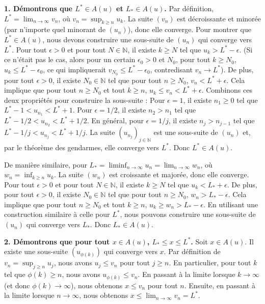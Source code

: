 \documentclass{report}
\begin{document}
\textbf{1. Démontrons que $L^* \in A(u)$ et $L_* \in A(u)$.}
Par définition, $L^* = \lim_{n \to \infty} v_n$, où $v_n = \sup_{k \ge n} u_k$. La suite $(v_n)$ est décroissante et minorée (par n'importe quel minorant de $(u_n)$), donc elle converge.
Pour montrer que $L^* \in A(u)$, nous devons construire une sous-suite de $(u_n)$ qui converge vers $L^*$.
Pour tout $\epsilon > 0$ et pour tout $N \in \mathbb{N}$, il existe $k \ge N$ tel que $u_k > L^* - \epsilon$. (Si ce n'était pas le cas, alors pour un certain $\epsilon_0 > 0$ et $N_0$, pour tout $k \ge N_0$, $u_k \le L^* - \epsilon_0$, ce qui impliquerait $v_{N_0} \le L^* - \epsilon_0$, contredisant $v_n \to L^*$).
De plus, pour tout $\epsilon > 0$, il existe $N_0 \in \mathbb{N}$ tel que pour tout $n \ge N_0$, $v_n < L^* + \epsilon$. Cela implique que pour tout $n \ge N_0$ et tout $k \ge n$, $u_k \le v_n < L^* + \epsilon$.
Combinons ces deux propriétés pour construire la sous-suite :
Pour $\epsilon = 1$, il existe $n_1 \ge 0$ tel que $L^* - 1 < u_{n_1} < L^* + 1$.
Pour $\epsilon = 1/2$, il existe $n_2 > n_1$ tel que $L^* - 1/2 < u_{n_2} < L^* + 1/2$.
En général, pour $\epsilon = 1/j$, il existe $n_j > n_{j-1}$ tel que $L^* - 1/j < u_{n_j} < L^* + 1/j$.
La suite $(u_{n_j})_{j \in \mathbb{N}}$ est une sous-suite de $(u_n)$ et, par le théorème des gendarmes, elle converge vers $L^*$.
Donc $L^* \in A(u)$.

De manière similaire, pour $L_* = \liminf_{n \to \infty} u_n = \lim_{n \to \infty} w_n$, où $w_n = \inf_{k \ge n} u_k$. La suite $(w_n)$ est croissante et majorée, donc elle converge.
Pour tout $\epsilon > 0$ et pour tout $N \in \mathbb{N}$, il existe $k \ge N$ tel que $u_k < L_* + \epsilon$.
De plus, pour tout $\epsilon > 0$, il existe $N_0 \in \mathbb{N}$ tel que pour tout $n \ge N_0$, $w_n > L_* - \epsilon$. Cela implique que pour tout $n \ge N_0$ et tout $k \ge n$, $u_k \ge w_n > L_* - \epsilon$.
En utilisant une construction similaire à celle pour $L^*$, nous pouvons construire une sous-suite de $(u_n)$ qui converge vers $L_*$.
Donc $L_* \in A(u)$.

\textbf{2. Démontrons que pour tout $x \in A(u)$, $L_* \le x \le L^*$.}
Soit $x \in A(u)$. Il existe une sous-suite $(u_{\phi(k)})$ qui converge vers $x$.
Par définition de $v_n = \sup_{j \ge n} u_j$, nous avons $u_j \le v_n$ pour tout $j \ge n$.
En particulier, pour tout $k$ tel que $\phi(k) \ge n$, nous avons $u_{\phi(k)} \le v_n$.
En passant à la limite lorsque $k \to \infty$ (et donc $\phi(k) \to \infty$), nous obtenons $x \le v_n$ pour tout $n$.
Ensuite, en passant à la limite lorsque $n \to \infty$, nous obtenons $x \le \lim_{n \to \infty} v_n = L^*$.
\end{document}
